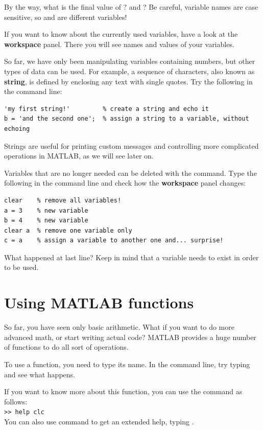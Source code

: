 \documentclass{article}
\begin{document}
By the way, what is the final value of ? and ?
Be careful, variable names are case sensitive, so  and  are different variables!%

If you want to know about the currently used variables, have a look at the \textbf{workspace} panel.
There you will see names and values of your variables.

So far, we have only been manipulating variables containing numbers, but other types of data can be used.
For example, a sequence of characters, also known as \textbf{string}, is defined by enclosing any text with single quotes.
Try the following in the command line:
\begin{lstlisting}
'my first string!'         % create a string and echo it
b = 'and the second one';  % assign a string to a variable, without echoing
\end{lstlisting}
Strings are useful for printing custom messages and controlling more complicated
operations in MATLAB, as we will see later on. 

Variables that are no longer needed can be deleted with the  command.
Type the following in the command line and check how the \textbf{workspace} panel changes:
\begin{lstlisting}
clear    % remove all variables!
a = 3    % new variable
b = 4    % new variable
clear a  % remove one variable only
c = a    % assign a variable to another one and... surprise!
\end{lstlisting}
What happened at last line? Keep in mind that a variable needs to exist in order to be used.


\section{Using MATLAB functions}

So far, you have seen only basic arithmetic.
What if you want to do more advanced math, or start writing actual code?
MATLAB provides a huge number of functions to do all sort of operations.

To use a function, you need to type its name.
In the command line, try typing  and see what happens.

If you want to know more about this function, you can use the  command as follows: \\
\verb|>> help clc| \\
You can also use  command to get an extended help, typing .
\end{document}
